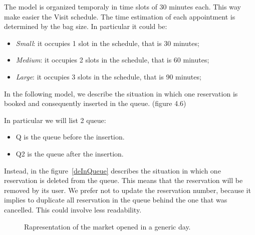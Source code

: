 The model is organized temporaly in time slots of 30 minutes each. This way make easier the Visit schedule. The time estimation of each appointment is determined by the bag size. In particular it could be:
\begin{itemize}
\item \textit{Small}: it occupies 1 slot in the schedule, that is 30 minutes;
\item \textit{Medium}: it occupies 2 slots in the schedule, that is 60 minutes;
\item \textit{Large}: it occupies 3 slots in the schedule, that is 90 minutes;
\end{itemize}


In the following model, we describe the situation in which one reservation is booked and consequently inserted in the queue. (figure 4.6)

In particular we will list 2 queue:
\begin{itemize}
\item Q is the queue before the insertion.
\item Q2 is the queue after the insertion.
\end{itemize}



Instead, in the figure~\ref{deInQueue} describes the situation in which one reservation is deleted from the queue.
This means that the reservation will be removed by its user.
We prefer not to update the reservation number, because it implies to duplicate all reservation in the queue behind the one that was cancelled. This could involve less readability.

\pagebreak



\pagebreak

\begin{figure}[H]
  \label{marketOpened}
  \centering
    \caption{Rapresentation of the market opened in a generic day.}
\end{figure}

